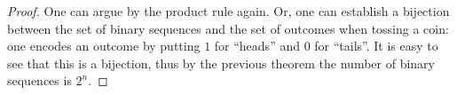 

\setcounter{section}{2}
\setcounter{subsection}{2}
\setcounter{dfn}{6}

\begin{proof}
One can argue by the product rule again.
Or, one can establish a bijection between the set of binary sequences and the set of outcomes when tossing a coin:
one encodes an outcome by putting $1$ for ``heads'' and $0$ for ``tails''.
It is easy to see that this is a bijection, thus by the previous theorem the number of binary sequences is $2^n$.
\end{proof}



